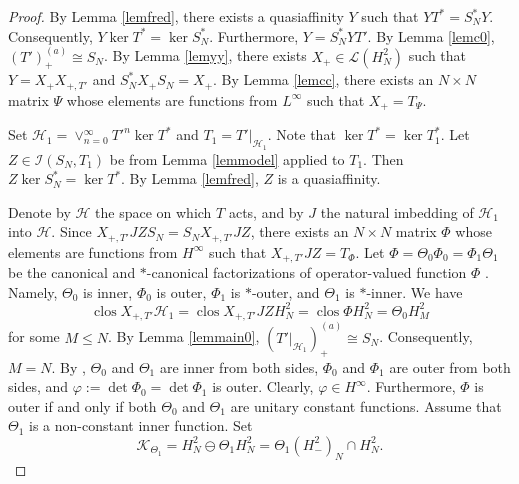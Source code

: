 \documentclass[a4paper,oneside,11pt]{amsart}
\numberwithin{equation}{section}
\theoremstyle{plain}
\theoremstyle{definition}
\begin{document}
\begin{proof} 
By Lemma \ref{lemfred}, there exists a quasiaffinity $Y$
such that  $YT^*=S_N^*Y$. Consequently, $Y\ker T^*=\ker S_N^*$.  
Furthermore, $Y=S_N^*YT'$.  By Lemma \ref{lemc0}, $(T')_+^{(a)}\cong S_N$. By Lemma \ref{lemyy}, there exists 
$X_+\in\mathcal L(H^2_N)$ such that  $Y=X_+X_{+,T'}$ and $S_N^*X_+S_N=X_+$. By Lemma \ref{lemcc},  there exists 
an $N\times N$ matrix $\Psi$ whose elements are functions from $L^\infty$ such that $X_+=T_\Psi$. 

Set $\mathcal H_1= \vee_{n=0}^\infty T'^n\ker T^*$ and  $T_1=T'|_{\mathcal H_1}$. Note that $\ker T^*=\ker T_1^*$.
Let $Z\in \mathcal I(S_N, T_1)$ be from Lemma \ref{lemmodel} applied to $T_1$.
Then $Z\ker S_N^*=\ker T^*$. By Lemma \ref{lemfred}, $Z$ is a quasiaffinity. 

Denote by $\mathcal H$ the space on which $T$ acts, and by $J$ the natural imbedding of 
 $\mathcal H_1$ into $\mathcal H$. 
Since $X_{+,T'}JZS_N=S_NX_{+,T'}JZ$, there exists an $N\times N$ matrix $\Phi$ whose elements are functions from $H^\infty$ such that 
$X_{+,T'}JZ=T_\Phi$. Let $\Phi=\Theta_0\Phi_0=\Phi_1\Theta_1$ be the canonical and $*$-canonical factorizations of 
operator-valued function 
$\Phi$ {\cite[Sec. V.4.3]{nfbk}}. Namely, $\Theta_0$ is inner, $\Phi_0$ is outer, $\Phi_1$ is $*$-outer, and $\Theta_1$ is $*$-inner. We have 
\begin{equation}\label{closhh1}\operatorname{clos}X_{+,T'}\mathcal H_1=\operatorname{clos}X_{+,T'}JZ H^2_N=\operatorname{clos}\Phi H^2_N=\Theta_0 H^2_M
\end{equation}
for some $M\leq N$. By Lemma \ref{lemmain0}, $(T'|_{\mathcal H_1})_+^{(a)}\cong S_N$. Consequently, $M=N$. By {\cite[Secs. V.6.1, V.6.2]{nfbk}}, 
$\Theta_0$ and $\Theta_1$ are inner from both sides, $\Phi_0$ and $\Phi_1$ are outer from both sides, and $\varphi:=\det \Phi_0=\det\Phi_1$ 
is outer. Clearly, $\varphi\in H^\infty$. 
Furthermore, $\Phi$ is outer if and only if both $\Theta_0$ and $\Theta_1$ are unitary constant functions. 
Assume that $\Theta_1$ is a non-constant inner function. Set 
\begin{equation*}\mathcal K_{\Theta_1}=H^2_N\ominus\Theta_1 H^2_N=\Theta_1 (H^2_-)_N\cap H^2_N.
\end{equation*}


\end{proof}
\end{document}
